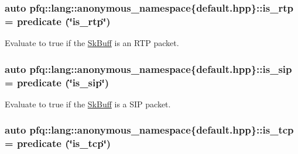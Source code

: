 \subsubsection[{\texorpdfstring{is\+\_\+rtp}{is_rtp}}]{\setlength{\rightskip}{0pt plus 5cm}auto pfq\+::lang\+::anonymous\+\_\+namespace\{default.\+hpp\}\+::is\+\_\+rtp = {\bf predicate} (\char`\"{}is\+\_\+rtp\char`\"{})}\hypertarget{namespacepfq_1_1lang_1_1anonymous__namespace_02default_8hpp_03_afef6f6217cb5e1bc0a8d1c88dbab0307}{}\label{namespacepfq_1_1lang_1_1anonymous__namespace_02default_8hpp_03_afef6f6217cb5e1bc0a8d1c88dbab0307}


Evaluate to {\ttfamily true} if the \hyperlink{structpfq_1_1lang_1_1SkBuff}{Sk\+Buff} is an R\+TP packet. 

\subsubsection[{\texorpdfstring{is\+\_\+sip}{is_sip}}]{\setlength{\rightskip}{0pt plus 5cm}auto pfq\+::lang\+::anonymous\+\_\+namespace\{default.\+hpp\}\+::is\+\_\+sip = {\bf predicate} (\char`\"{}is\+\_\+sip\char`\"{})}\hypertarget{namespacepfq_1_1lang_1_1anonymous__namespace_02default_8hpp_03_a8be76da99d48c27e0377a7b32e1b5d7d}{}\label{namespacepfq_1_1lang_1_1anonymous__namespace_02default_8hpp_03_a8be76da99d48c27e0377a7b32e1b5d7d}


Evaluate to {\ttfamily true} if the \hyperlink{structpfq_1_1lang_1_1SkBuff}{Sk\+Buff} is a S\+IP packet. 

\subsubsection[{\texorpdfstring{is\+\_\+tcp}{is_tcp}}]{\setlength{\rightskip}{0pt plus 5cm}auto pfq\+::lang\+::anonymous\+\_\+namespace\{default.\+hpp\}\+::is\+\_\+tcp = {\bf predicate} (\char`\"{}is\+\_\+tcp\char`\"{})}\hypertarget{namespacepfq_1_1lang_1_1anonymous__namespace_02default_8hpp_03_a67fe3072aa5353c1526aa04320d40137}{}\label{namespacepfq_1_1lang_1_1anonymous__namespace_02default_8hpp_03_a67fe3072aa5353c1526aa04320d40137}


